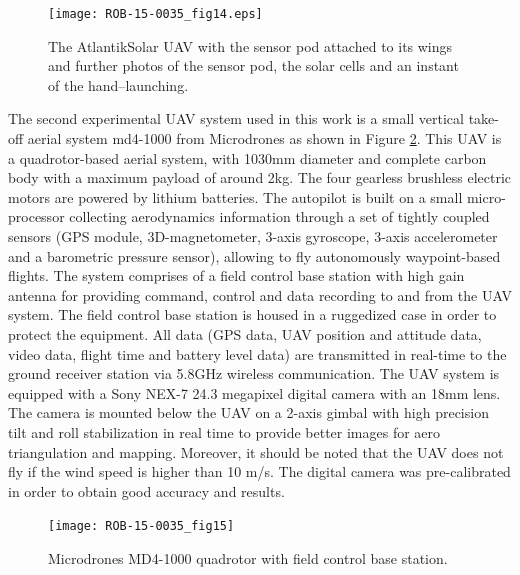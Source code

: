 \documentclass{article}
\begin{document}
\begin{figure}
    \centering
    \texttt{[image: ROB-15-0035\_fig14.eps]}
    \caption{The AtlantikSolar UAV with the sensor pod attached to its wings and further photos of the sensor pod, the solar cells and an instant of the hand--launching.}
    \label{AS_P_wSensorPod}
\end{figure}

The second experimental UAV system used in this work is a small vertical take-off aerial system md4-1000 from Microdrones as shown in Figure \ref{fig:UAV}.
This UAV is a quadrotor-based aerial system, with 1030mm diameter and complete carbon body with a maximum payload of around 2kg.
The four gearless brushless electric motors are powered by lithium batteries.
The autopilot is built on a small micro-processor collecting aerodynamics information through a set of tightly coupled sensors (GPS module, 3D-magnetometer, 3-axis gyroscope, 3-axis accelerometer and a barometric pressure sensor), allowing to fly autonomously waypoint-based flights.
The system comprises of a field control base station with high gain antenna for providing command, control and data recording to and from the UAV system.
The field control base station is housed in a ruggedized case in order to protect the equipment.
All data (GPS data, UAV position and attitude data, video data, flight time and battery level data) are transmitted in real-time to the ground receiver station via 5.8GHz wireless communication.
The UAV system is equipped with a Sony NEX-7 24.3 megapixel digital camera with an 18mm lens. The camera is mounted below the UAV on a 2-axis gimbal with high precision tilt and roll stabilization in real time to provide better images for aero triangulation and mapping.
Moreover, it should be noted that the UAV does not fly if the wind speed is higher than 10 m/s.
The digital camera was pre-calibrated in order to obtain good accuracy and results.
\begin{figure}[h]
\centering
\texttt{[image: ROB-15-0035\_fig15]}
\caption{Microdrones MD4-1000 quadrotor with field control base station.}
\label{fig:UAV}
\end{figure}
\end{document}
